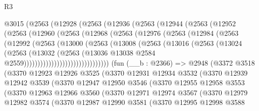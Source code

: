 \begin{lexlean}{R3}
\begin{coremodule}
    @3015
      (@2563
        (@12928
          (@2563
            (@12936
              (@2563
                (@12944
                  (@2563
                    (@12952
                      (@2563
                        (@12960
                          (@2563
                            (@12968
                              (@2563
                                (@12976
                                  (@2563
                                    (@12984
                                      (@2563
                                        (@12992
                                          (@2563
                                            (@13000
                                              (@2563
                                                (@13008
                                                  (@2563
                                                    (@13016
                                                      (@2563
                                                        (@13024
                                                          (@2563
                                                            (@13032
                                                              (@2563
                                                                (@13036
                                                                  @13038
                                                                  @2584
                                                                  @2559)))))))))))))))))))))))))))))))
    (fun (__b : @2366) =>
    @2948
      (@3372
        @3518
        (@3370
          @12923
          @12926
          @3525
          (@3370
            @12931
            @12934
            @3532
            (@3370
              @12939
              @12942
              @3539
              (@3370
                @12947
                @12950
                @3546
                (@3370
                  @12955
                  @12958
                  @3553
                  (@3370
                    @12963
                    @12966
                    @3560
                    (@3370
                      @12971
                      @12974
                      @3567
                      (@3370
                        @12979
                        @12982
                        @3574
                        (@3370
                          @12987
                          @12990
                          @3581
                          (@3370
                            @12995
                            @12998
                            @3588

\end{coremodule}
\end{lexlean}
